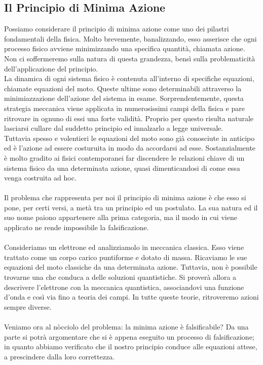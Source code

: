 \documentclass[]{article}
\begin{document}
	\subsection{Il Principio di Minima Azione}
	Possiamo considerare il principio di minima azione come uno dei pilastri fondamentali della fisica. Molto brevemente, banalizzando, esso asserisce che ogni processo fisico avviene minimizzando una specifica quantità, chiamata azione. Non ci soffermeremo sulla natura di questa grandezza, bensì sulla problematicità dell'applicazione del principio.\\
	La dinamica di ogni sistema fisico è contenuta all'interno di specifiche equazioni, chiamate equazioni del moto. Queste ultime sono determinabili attraverso la minimiazzazione dell'azione del sistema in esame. Sorprendentemente, questa strategia meccanica viene applicata in numerosissimi campi della fisica e pare ritrovare in ognuno di essi una forte validità. Proprio per questo risulta naturale lasciarsi cullare dal suddetto principio ed innalzarlo a legge universale.\\
	Tuttavia spesso e volentieri le equazioni del moto sono già conosciute in anticipo ed è l'azione ad essere costuruita in modo da accordarsi ad esse. Sostanzialmente è molto gradito ai fisici contemporanei far discendere le relazioni chiave di un sistema fisico da una determinata azione, quasi dimenticandosi di come essa venga costruita ad hoc.\\
	\\
	Il problema che rappresenta per noi il principio di minima azione è che esso si pone, per certi versi, a metà tra un principio ed un postulato. La sua natura ed il suo nome paiono appartenere alla prima categoria, ma il modo in cui viene applicato ne rende impossibile la falsificazione.
	\\\\
	Consideriamo un elettrone ed analizziamolo in meccanica classica. Esso viene trattato come un corpo carico puntiforme e dotato di massa. 
	Ricaviamo le sue equazioni del moto classiche da una determinata azione. Tuttavia, non è possibile trovarne una che conduca a delle soluzioni quantistiche. Si proverà allora a descrivere l'elettrone con la meccanica quantistica, associandovi una funzione d'onda e così via fino a teoria dei campi. In tutte queste teorie, ritroveremo azioni sempre diverse.\\
	\\
	Veniamo ora al nòcciolo del problema: la minima azione è falsificabile? Da una parte si potrà argomentare che si è appena eseguito un processo di falsificazione; in quanto abbiamo verificato che il nostro principio conduce alle equazioni attese, a prescindere dalla loro correttezza.
\end{document}
